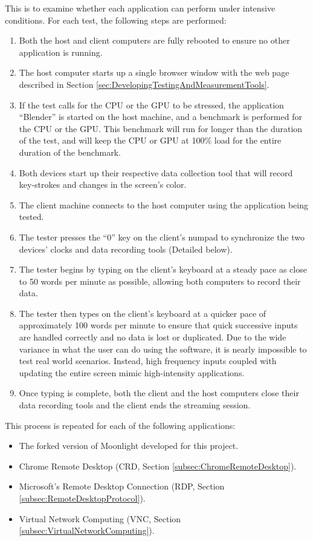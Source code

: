 \noindent
This is to examine whether each application can perform under intensive conditions.
For each test, the following steps are performed:

\begin{enumerate}
  \item Both the host and client computers are fully rebooted to ensure no other application is running.
  \item The host computer starts up a single browser window with the web page described in Section \ref{sec:DevelopingTestingAndMeasurementTools}.
  \item If the test calls for the CPU or the GPU to be stressed, the application \enquote{Blender} is started on the host machine, and a benchmark is performed for the CPU or the GPU.
        This benchmark will run for longer than the duration of the test, and will keep the CPU or GPU at 100\% load for the entire duration of the benchmark.
  \item Both devices start up their respective data collection tool that will record key-strokes and changes in the screen's color.
  \item The client machine connects to the host computer using the application being tested.
  \item The tester presses the \enquote{0} key on the client's numpad to synchronize the two devices' clocks and data recording tools (Detailed below).
  \item The tester begins by typing on the client's keyboard at a steady pace as close to 50 words per minute as possible, allowing both computers to record their data.
  \item The tester then types on the client's keyboard at a quicker pace of approximately 100 words per minute to ensure that quick successive inputs are handled correctly and no data is lost or duplicated.
  Due to the wide variance in what the user can do using the software, it is nearly impossible to test real world scenarios.
  Instead, high frequency inputs coupled with updating the entire screen mimic high-intensity applications.
  \item Once typing is complete, both the client and the host computers close their data recording tools and the client ends the streaming session.
\end{enumerate}

\noindent
This process is repeated for each of the following applications:

\begin{itemize}
  \item The forked version of Moonlight developed for this project.
  \item Chrome Remote Desktop (CRD, Section \ref{subsec:ChromeRemoteDesktop}).
  \item Microsoft's Remote Desktop Connection (RDP, Section \ref{subsec:RemoteDesktopProtocol}).
  \item Virtual Network Computing (VNC, Section \ref{subsec:VirtualNetworkComputing}).
\end{itemize}

